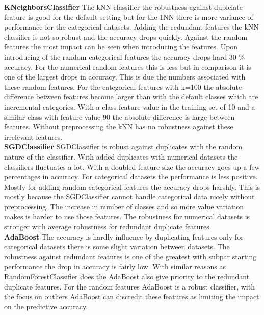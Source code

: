 \documentclass[a4paper,10pt]{article}
\begin{document}
\textbf{KNeighborsClassifier} The kNN classifier the robustness against duplciate feature is good for the default setting but for the 1NN there is more variance of performance for the categorical datasets. Adding the redundant features the kNN classifier is not so robust and the accuracy drops quickly. Against the random features the most impact can be seen when introducing the features. Upon introducing of the random categorical features the accuracy drops hard 30 $\%$ accuracy. For the numerical random features this is less but in comparison it is one of the largest drops in accuracy. This is due the numbers associated with these random features. For the categorical features with k=100 the absolute difference between features become larger than with the default classes which are incremental categories. With a class feature value in the training set of 10 and a similar class with feature value 90 the absolute difference is large between features. Without preprocessing the kNN has no robustness against these irrelevant features. \\

\textbf{SGDClassifier} SGDClassifier is robust against duplicates with the random nature of the classifier. With added duplicates with numerical datasets the classifiers fluctuates a lot. With a doubled feature size the accuracy goes up a few percentages in accuracy. For categorical datasets the performance is less positive. Mostly for adding random categorical features the accuracy drops harshly. This is mostly because the SGDClassifier cannot handle categorical data nicely without preprocessing. The increase in number of classes and so more value variation makes is harder to use those features. The robustness for numerical datasets is stronger with average robustness for redundant duplicate features.  \\

\textbf{AdaBoost} The accuracy is hardly influence by duplicating features only for categorical datasets there is some slight variation between datasets. The robustness against redundant features is one of the greatest with subpar starting performance the drop in accuracy is fairly low. With similar reasons as RandomForestClassifier does the AdaBoost also give priority to the redundant duplicate features. For the random features AdaBoost is a robust classifier, with the focus on outliers AdaBoost can discredit these features as limiting the impact on the predictive accuracy. \\
\end{document}
